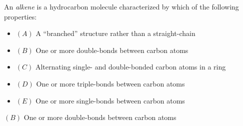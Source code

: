 

An {\it alkene} is a hydrocarbon molecule characterized by which of the following properties:

\begin{itemize}
\item{$(A)$} A ``branched'' structure rather than a straight-chain
\vskip 5pt
\item{$(B)$} One or more double-bonds between carbon atoms
\vskip 5pt
\item{$(C)$} Alternating single- and double-bonded carbon atoms in a ring
\vskip 5pt
\item{$(D)$} One or more triple-bonds between carbon atoms
\vskip 5pt
\item{$(E)$} One or more single-bonds between carbon atoms
\end{itemize}







\item{$(B)$} One or more double-bonds between carbon atoms
 









